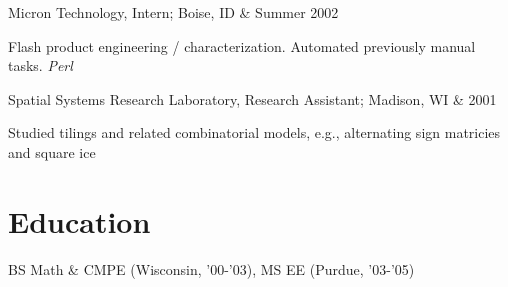 \documentclass[letterpaper]{scrartcl}
\begin{document}
\begin{list1}
\item \begin{tabular1bold} Micron Technology, Intern; Boise, ID & Summer 2002 \end{tabular1bold}

  \begin{list2}
  \item Flash product engineering / characterization. Automated previously manual tasks. \hfill \emph{Perl}
  \end{list2}
\item \begin{tabular1bold} Spatial Systems Research Laboratory, Research Assistant; Madison, WI & 2001 \end{tabular1bold}

  \begin{list2}
  \item Studied tilings and related combinatorial models, e.g., alternating sign matricies and square ice
  \end{list2}
\end{list1}

\section*{Education}
\begin{list1}
\item
  \begin{tabular1bold}BS Math \& CMPE (Wisconsin, '00-'03), MS EE (Purdue, '03-'05)\end{tabular1bold}
\end{list1}
\end{document}
